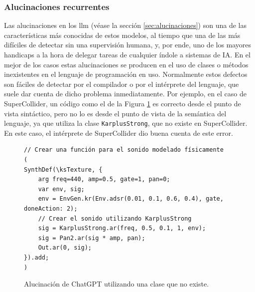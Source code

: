 \subsubsection{Alucinaciones recurrentes}
Las {alucinaciones} en los \gls{llm} (véase la sección \ref{sec:alucinaciones}) son una de las características más conocidas de estos modelos, al tiempo que una de las más difíciles de detectar sin una supervisión humana, y, por ende, uno de los mayores handicaps a la hora de delegar tareas de cualquier índole a sistemas de IA. En el mejor de los casos estas alucinaciones se producen en el uso de clases o métodos inexistentes en el lenguaje de programación en uso. Normalmente estos defectos son fáciles de detectar por el compilador o por el intérprete del lenguaje, que suele dar cuenta de dicho problema inmediatamente. Por ejemplo, en el caso de SuperCollider, un código como el de la Figura \ref{fig:alucinacion_chatgpt} es correcto desde el punto de vista sintáctico, pero no lo es desde el punto de vista de la semántica del lenguaje, ya que utiliza la clase \texttt{KarplusStrong}, que no existe en SuperCollider. En este caso, el intérprete de SuperCollider dio buena cuenta de este error. 

\begin{figure}[H]
    \caption[Alucinación de ChatGPT utilizando una clase que no existe]{Alucinación de ChatGPT utilizando una clase que no existe.}
    \centering
    \begin{lstlisting}[style=SuperCollider-IDE, basicstyle=\footnotesize\ttfamily, numbers=none]
// Crear una función para el sonido modelado físicamente
(
SynthDef(\ksTexture, {
    arg freq=440, amp=0.5, gate=1, pan=0;
    var env, sig;
    env = EnvGen.kr(Env.adsr(0.01, 0.1, 0.6, 0.4), gate, doneAction: 2);
    // Crear el sonido utilizando KarplusStrong
    sig = KarplusStrong.ar(freq, 0.5, 0.1, 1, env);
    sig = Pan2.ar(sig * amp, pan);
    Out.ar(0, sig);
}).add;
)
    \end{lstlisting}
    \source{\propio}
    \label{fig:alucinacion_chatgpt}
\end{figure}


